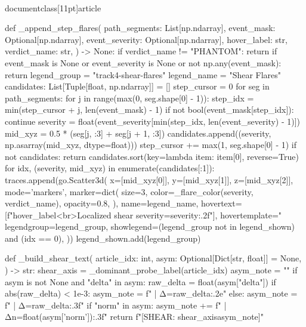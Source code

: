 \\documentclass[11pt]{article}
\begin{document}
\begin{CodeBlock}
{{    def _append_step_flares(
        path_segments: List[np.ndarray],
        event_mask: Optional[np.ndarray],
        event_severity: Optional[np.ndarray],
        hover_label: str,
        verdict_name: str,
    ) -> None:
        if verdict_name != "PHANTOM":
            return
        if event_mask is None or event_severity is None or not np.any(event_mask):
            return
        legend_group = "track4-shear-flares"
        legend_name = "Shear Flares"
        candidates: List[Tuple[float, np.ndarray]] = []
        step_cursor = 0
        for seg in path_segments:
            for j in range(max(0, seg.shape[0] - 1)):
                step_idx = min(step_cursor + j, len(event_mask) - 1)
                if not bool(event_mask[step_idx]):
                    continue
                severity = float(event_severity[min(step_idx, len(event_severity) - 1)])
                mid_xyz = 0.5 * (seg[j, :3] + seg[j + 1, :3])
                candidates.append((severity, np.asarray(mid_xyz, dtype=float)))
            step_cursor += max(1, seg.shape[0] - 1)
        if not candidates:
            return
        candidates.sort(key=lambda item: item[0], reverse=True)
        for idx, (severity, mid_xyz) in enumerate(candidates[:1]):
            traces.append(go.Scatter3d(
                x=[mid_xyz[0]],
                y=[mid_xyz[1]],
                z=[mid_xyz[2]],
                mode='markers',
                marker=dict(
                    size=3,
                    color=_flare_color(severity, verdict_name),
                    opacity=0.8,
                ),
                name=legend_name,
                hovertext=[f"{hover_label}<br>Localized shear severity={severity:.2f}"],
                hovertemplate="%
                legendgroup=legend_group,
                showlegend=(legend_group not in legend_shown) and (idx == 0),
            ))
        legend_shown.add(legend_group)

    def _build_shear_text(
        article_idx: int,
        asym: Optional[Dict[str, float]] = None,
    ) -> str:
        shear_axis = _dominant_probe_label(article_idx)
        asym_note = ""
        if asym is not None and "delta" in asym:
            raw_delta = float(asym["delta"])
            if abs(raw_delta) < 1e-3:
                asym_note = f" | Δ={raw_delta:.2e}"
            else:
                asym_note = f" | Δ={raw_delta:.3f}"
            if "norm" in asym:
                asym_note += f" | Δn={float(asym['norm']):.3f}"
        return f"[SHEAR: {shear_axis}{asym_note}]"

}}
\end{CodeBlock}
\end{document}
